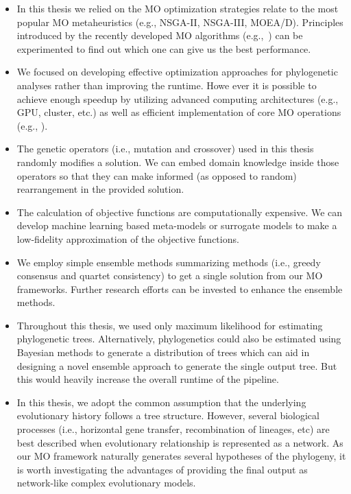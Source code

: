 \begin{itemize}
	\item In this thesis we relied on the MO optimization strategies relate to the most popular MO metaheuristics (e.g., NSGA-II, NSGA-III, MOEA/D). Principles introduced by the recently developed MO algorithms (e.g.,~\cite{8981871, 9047876, 9097242}) can be experimented to find out which one can give us the best performance.
	
	\item We focused on developing effective optimization approaches for phylogenetic analyses rather than improving the runtime. Howe ever it is possible to achieve enough speedup by utilizing advanced computing architectures (e.g., GPU, cluster, etc.) as well as efficient implementation of core MO operations (e.g., \cite{8255834, 7738460}). 
	
	\item The genetic operators (i.e., mutation and crossover) used in this thesis randomly modifies a solution. We can embed domain knowledge inside those operators so that they can make informed (as opposed to random) rearrangement in the provided solution.  
	
	\item The calculation of objective functions are computationally expensive. We can develop machine learning based meta-models or surrogate models to make a low-fidelity approximation of the objective functions. 
	 
	\item We employ simple ensemble methods summarizing methods (i.e., greedy consensus and quartet consistency) to get a single solution from our MO frameworks. Further research efforts can be invested to enhance the ensemble methods.

	\item Throughout this thesis, we used only maximum likelihood for estimating phylogenetic trees. Alternatively, phylogenetics could also be estimated using Bayesian methods to generate a distribution of trees which can aid in designing a novel ensemble approach to generate the single output tree. But this would heavily increase the overall runtime of the pipeline.
	
	\item In this thesis, we adopt the common assumption that the underlying evolutionary history follows a tree structure. However, several biological processes (i.e., horizontal gene transfer, recombination of lineages, etc) are best described when evolutionary relationship is represented as a network. As our MO framework naturally generates several hypotheses of the phylogeny, it is worth investigating the advantages of providing the final output as network-like complex evolutionary models.

	
		
\end{itemize}

